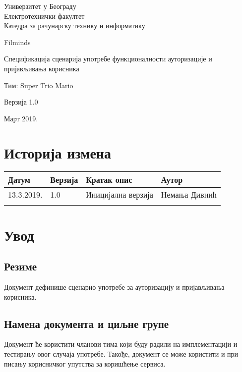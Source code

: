 \documentclass[12pt,a4paper]{article}
\begin{document}
\begin{titlepage}
\begin{center}
  Универзитет у Београду \\
  Електротехнички факултет \\
  Катедра за рачунарску технику и информатику \\
  \vfill

  {\fontsize{50}{60}\selectfont Filminds}
  \vskip 0.6cm

  {\large Спецификација сценарија употребе функционалности ауторизације и пријављивања корисника }
  \vskip 0.3cm
  
  {\large Тим: Super Trio Mario}
  \vskip 0.3cm

  {\large Верзија 1.0}

  \vfill
  \vfill

  Март 2019.
\hfill

\end{center}
\end{titlepage}

\section*{Историја измена}
\noindent
\setcellgapes{4pt}
\makegapedcells
\begin{tabularx}{\linewidth}{|l|l|X|X|}
    \hline
    \textbf{Датум} & \textbf{Верзија} & \textbf{Кратак опис} & \textbf{Аутор} \\
    \hline
    13.3.2019. & 1.0 & Иницијална верзија & Немања Дивнић \\
    \hline
    & & & \\
    \hline
\end{tabularx}
\newpage

\tableofcontents
\newpage

\section{Увод}
\subsection{Резиме}
Документ дефинише сценарио употребе за ауторизацију и пријављивања корисника.
\subsection{Намена документа и циљне групе}
Документ ће користити чланови тима који буду радили на имплементацији и тестирању овог случаја употребе. Такође, документ се може користити и при писању корисничког упутства за коришћење сервиса.
\end{document}
